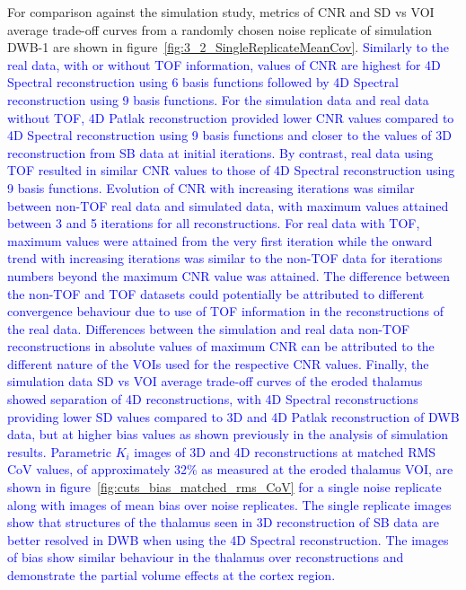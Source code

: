 For comparison against the simulation study, metrics of CNR and SD vs VOI average trade-off curves from a randomly chosen noise replicate of simulation DWB-1 are shown in figure~\ref{fig:3_2_SingleReplicateMeanCov}.
\textcolor{blue}{Similarly to the real data, with or without TOF information, values of CNR are highest for 4D Spectral reconstruction using 6 basis functions followed by 4D Spectral reconstruction using 9 basis functions.
For the simulation data and real data without TOF, 4D Patlak reconstruction provided lower CNR values compared to 4D Spectral reconstruction using 9 basis functions and closer to the values of 3D reconstruction from SB data at initial iterations. By contrast, real data using TOF resulted in similar CNR values to those of 4D Spectral reconstruction using 9 basis functions.
Evolution of CNR with increasing iterations was similar between non-TOF real data and simulated data, with maximum values attained between 3 and 5 iterations for all reconstructions.
For real data with TOF, maximum values were attained from the very first iteration while the onward trend with increasing iterations was similar to the non-TOF data for iterations numbers beyond the maximum CNR value was attained.
The difference between the non-TOF and TOF datasets could potentially be attributed to different convergence behaviour due to use of TOF information in the reconstructions of the real data. Differences between the simulation and real data non-TOF reconstructions in absolute values of maximum CNR can be attributed to the different nature of the VOIs used for the respective CNR values.
Finally, the simulation data SD vs VOI average trade-off curves of the eroded thalamus showed separation of 4D reconstructions, with 4D Spectral reconstructions providing lower SD values compared to 3D and 4D Patlak reconstruction of DWB data, but at higher bias values as shown previously in the analysis of simulation results.
Parametric $K_i$ images of 3D and 4D reconstructions at matched RMS CoV values, of approximately 32\% as measured at the eroded thalamus VOI, are shown in figure~\ref{fig:cuts_bias_matched_rms_CoV} for a single noise replicate along with images of mean bias over noise replicates. The single replicate images show that structures of the thalamus seen in 3D reconstruction of SB data are better resolved in DWB when using the 4D Spectral reconstruction. The images of bias show similar behaviour in the thalamus over reconstructions and demonstrate the partial volume effects at the cortex region.}

